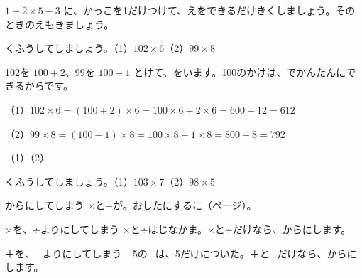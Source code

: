 \begin{jibun}
$1+2\times5-3$ に、かっこを1だけつけて、えをできるだけきくしましょう。そのときのえもきましょう。
\end{jibun}

\begin{reidai}
くふうしてしましょう。\quad（1）\nobreak $102\times6$\quad（2）\nobreak $99\times8$\par
\kangaekata 102を $100+2$、99を $100-1$ とけて、をいます。100のかけは、でかんたんにできるからです。\par
\shiki（1）$102\times6=(100+2)\times6=100\times6+2\times6=600+12=612$\par
\hspace*{2.6\zw}（2）$99\times8=(100-1)\times8=100\times8-1\times8=800-8=792$\par
\kotae（1）\quad（2）
\end{reidai}

\begin{jibun}
くふうしてしましょう。\quad（1）\nobreak $103\times7$\quad（2）\nobreak $98\times5$
\end{jibun}


\begin{tsumazuki}{からにしてしまう}
×と÷が。おしたにするに（\pageref{bk:2-11:dentaku}ページ）。
\end{tsumazuki}

\begin{tsumazuki}{×を、÷よりにしてしまう}
×と÷はじなかま。×と÷だけなら、からにします。
\end{tsumazuki}

\begin{tsumazuki}{＋を、−よりにしてしまう}
−5の−は、5だけについた。＋と−だけなら、からにします。
\end{tsumazuki}


